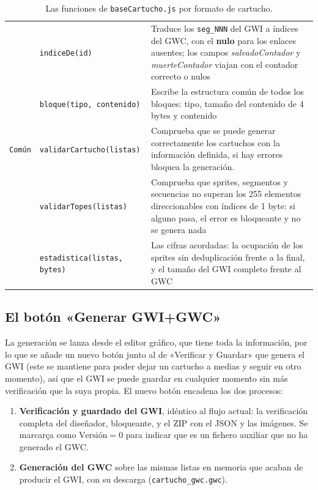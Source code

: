 \begin{table}[H]
\begin{tabularx}{\textwidth}{@{}l l X@{}}
		& \texttt{indiceDe(id)} & Traduce los \texttt{seg\_NNN} del GWI a
		índices del GWC, con el \textbf{nulo} para los enlaces
		ausentes; los campos \emph{salvadoContador} y
		\emph{muerteContador} viajan con el contador correcto o nulos \\
		
		& \texttt{bloque(tipo, contenido)} & Escribe la estructura común
		de todos los bloques: tipo, tamaño del contenido de 4 bytes y
		contenido \\
		
		\midrule
		\texttt{Común} & \texttt{validarCartucho(listas)}\footnotemark & Comprueba que se puede generar correctamente los cartuchos con la información definida, si hay errores bloquea la generación.\\	
		
		& \texttt{validarTopes(listas)} & Comprueba que sprites, segmentos
		y secuencias no superan los 255 elementos direccionables con
		índices de 1 byte: si alguno pasa, el error es bloqueante y no
		se genera nada \\
		
		& \texttt{estadistica(listas, bytes)} & Las cifras acordadas: la
		ocupación de los sprites sin deduplicación frente a la final, y
		el tamaño del GWI completo frente al GWC \\
		
		\bottomrule
	\end{tabularx}
	\caption{Las funciones de \texttt{baseCartucho.js} por formato de cartucho.}
	\label{tab:funcionesGenerador}
\end{table}


\subsection{El botón «Generar GWI+GWC»}
\label{sec:F5I3Boton}

La generación se lanza desde el editor gráfico, que tiene toda la información, por lo que se añade un nuevo botón junto al de «Verificar y Guardar» que genera el GWI (este se mantiene para poder dejar un cartucho a medias y seguir en otro momento), así que el GWI se puede guardar en cualquier momento sin más verificación que la suya propia. El nuevo botón encadena los dos procesos:

\begin{enumerate}
	\item \textbf{Verificación y guardado del GWI}, idéntico al flujo actual: la verificación completa del diseñador, bloqueante, y el ZIP con el JSON y las imágenes. Se marcarça como $\text{Versión} = 0$ para indicar que es un fichero auxiliar que no ha generado el GWC.
	
	\item \textbf{Generación del GWC} sobre las mismas listas en 	memoria que acaban de producir el GWI, con su descarga (\texttt{cartucho\_gwc.gwc}).
\end{enumerate}

